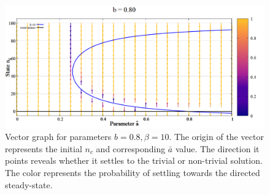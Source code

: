 \begin{figure}[h!]
 \centering
  \includegraphics[width=\linewidth]{images/appendix/vectors/4.png}
  \caption{Vector graph for parameters $b = 0.8, \beta = 10$. The origin of the vector represents the initial $n_{c}$ and corresponding $\bar{a}$ value. The direction it points reveals whether it settles to the trivial or non-trivial solution. The color represents the probability of settling towards the directed steady-state.}
  \label{fig:vectorplot}
\end{figure}










